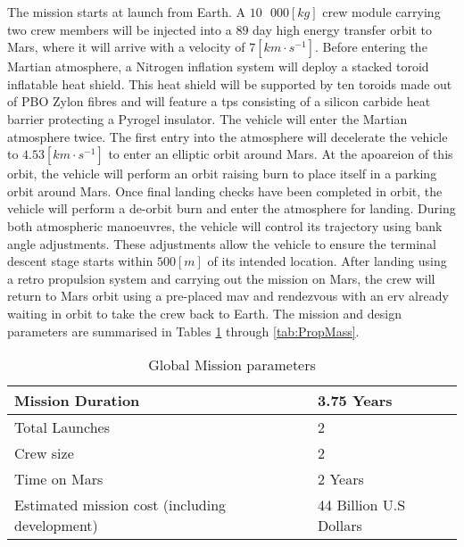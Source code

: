 The mission starts at launch from Earth. A $10\mbox{ }000 \left[kg\right]$ crew module carrying two crew members will be injected into a $89$ day high energy transfer orbit to Mars, where it will arrive with a velocity of $7 \left[km\cdot s^{-1}\right]$. Before entering the Martian atmosphere, a Nitrogen inflation system will deploy a stacked toroid inflatable heat shield. This heat shield will be supported by ten toroids made out of PBO Zylon\textsuperscript{\textregistered} fibres and will feature a \gls{tps} consisting of a silicon carbide heat barrier protecting a Pyrogel\textsuperscript{\textregistered} insulator. The vehicle will enter the Martian atmosphere twice. The first entry into the atmosphere will decelerate the vehicle to $4.53 \left[km\cdot s^{-1}\right]$ to enter an elliptic orbit around Mars. At the apoareion of this orbit, the vehicle will perform an orbit raising burn to place itself in a parking orbit around Mars. Once final landing checks have been completed in orbit, the vehicle will perform a de-orbit burn and enter the atmosphere for landing. During both atmospheric manoeuvres, the vehicle will control its trajectory using bank angle adjustments. These adjustments allow the vehicle to ensure the terminal descent stage starts within $500 \left[m\right]$ of its intended location. After landing using a retro propulsion system and carrying out the mission on Mars, the crew will return to Mars orbit using a pre-placed \gls{mav} and rendezvous with an \gls{erv} already waiting in orbit to take the crew back to Earth. The mission and design parameters are summarised in Tables \ref{tab:MissionPar} through \ref{tab:PropMass}.


\begin{table}[H]
	\centering
	\caption{Global Mission parameters}
	\label{tab:MissionPar}
	\begin{tabular}{|p{}|p{}|} \hline
		Mission Duration				             	& 	3.75 Years						\\ \hline 
		Total Launches       							&	2  		   	  					\\ \hline
		Crew size				 						&	2     	  						\\ \hline
		Time on Mars				              	   	&  	2 Years    						\\ \hline
		Estimated mission cost (including development) 	&  	44 Billion U.S Dollars			\\ \hline
	\end{tabular}
\end{table}

